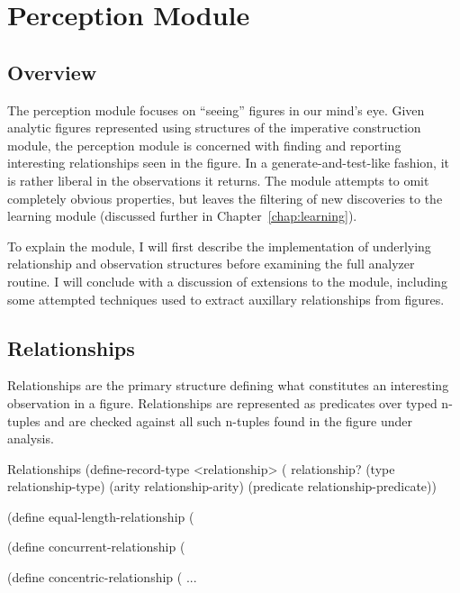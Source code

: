 \chapter{Perception Module}
\label{chap:observer}


\section{Overview}

The perception module focuses on ``seeing'' figures in our mind's eye.
Given analytic figures represented using structures of the imperative
construction module, the perception module is concerned with finding
and reporting interesting relationships seen in the figure. In a
generate-and-test-like fashion, it is rather liberal in the
observations it returns. The module attempts to omit completely
obvious properties, but leaves the filtering of new discoveries to the
learning module (discussed further in Chapter~\ref{chap:learning}).

To explain the module, I will first describe the implementation of
underlying relationship and observation structures before examining
the full analyzer routine. I will conclude with a discussion of
extensions to the module, including some attempted techniques used to
extract auxillary relationships from figures.

\section{Relationships}

Relationships are the primary structure defining what constitutes an
interesting observation in a figure. Relationships are represented as
predicates over typed n-tuples and are checked against all such
n-tuples found in the figure under analysis.

\begin{code-listing}
[label=relationship-structure]
{Relationships}
(define-record-type <relationship>
  (%
  relationship?
  (type relationship-type)
  (arity relationship-arity)
  (predicate relationship-predicate))

(define equal-length-relationship
  (%

(define concurrent-relationship
  (%

(define concentric-relationship
  (%
...
\end{code-listing}

